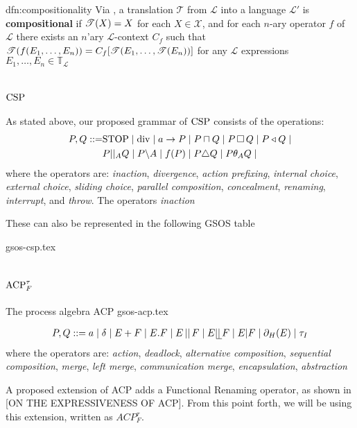 \documentclass[../hons_project.tex]{subfiles}
\begin{document}
\begin{dfn}[Compositionality]{dfn:compositionality}{}
   Via \cite{DBLP:conf/fossacs/Glabbeek18}, a translation $\mathscr{T}$ from $\mathscr{L}$ into a language $\mathscr{L}'$ is \textbf{compositional} if $\mathscr{T}(X) = X$ for each $X\in \mathscr{X}$, and for each $n$-ary operator $f$ of $\mathscr{L}$ there exists an $n$'ary $\mathscr{L}$-context $C_{f}$ such that $\mathscr{T}(f(E_{1},\dots,E_{n})) = C_{f}[\mathscr{T}(E_{1},\dots,\mathscr{T}(E_{n}))]$ for any $\mathscr{L}$ expressions $E_{1},\dots,E_{n}\in \mathbb{T}_{\mathscr{L}}$
\end{dfn}


\section{\texorpdfstring{$\mathrm{CSP}$}{CSP}}\label{ssec:CSP}
As stated above, our proposed grammar of $\mathrm{CSP}$ consists of the operations:
\begin{align*}
   P, Q ::= &\mathrm{STOP} \mid \mathrm{div} \mid a\to P \mid P \sqcap Q \mid P \,\square\, Q \mid P \triangleleft Q \mid \\
	&P | |_{A} Q \mid P \backslash A \mid f(P) \mid P \triangle Q \mid P \theta_{A} Q \mid 
\end{align*}
where the operators are: \textit{inaction}, \textit{divergence}, \textit{action prefixing}, \textit{internal choice}, \textit{external choice}, \textit{sliding choice}, \textit{parallel composition}, \textit{concealment}, \textit{renaming}, \textit{interrupt}, and \textit{throw}. The operators \textit{inaction}

These can also be represented in the following GSOS table

{gsos-csp.tex}

\section{\texorpdfstring{$\mathrm{ACP}_{F}^{\tau}$}{ACP-tf}}

The process algebra ACP
{gsos-acp.tex}

\begin{align*}
   P, Q ::= a \mid \delta \mid E + F \mid E . F \mid E \merge F \mid E \leftmerge F \mid E | F \mid \restrict(E) \mid \tau_{I}
\end{align*}
where the operators are: \textit{action}, \textit{deadlock}, \textit{alternative composition}, \textit{sequential composition}, \textit{merge}, \textit{left merge}, \textit{communication merge}, \textit{encapsulation}, \textit{abstraction}

A proposed extension of ACP adds a Functional Renaming operator, as shown in [ON THE EXPRESSIVENESS OF ACP]. From this point forth, we will be using this extension, written as $ACP^{\tau}_{F}$. 
\end{document}
